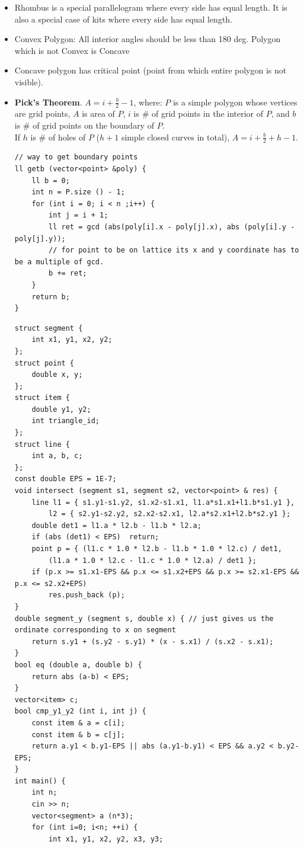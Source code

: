 \documentclass[8pt, a4paper, oneside, twocolumn]{extarticle}
\begin{document}
\begin{itemize}
    \item Rhombus is a special parallelogram where every side has equal length. It is also a special case of kits where every side has equal length.    
    \item Convex Polygon: All interior angles should be less than 180 deg. Polygon which is not Convex is Concave
    \item Concave polygon has critical point (point from which entire polygon is not visible).
    \item \textbf{Pick's Theorem}. $A=i+\frac{b}{2}-1$, where: $P$ is a simple polygon whose vertices are grid points, $A$ is area of $P$, $i$ is \# of grid points in the interior of $P$, and $b$ is \# of grid points on the boundary of $P$. \\
    If $h$ is \# of holes of $P$ ($h+1$ simple closed curves in total), $A=i+\frac{b}{2}+h-1$.
    \begin{verbatim}
// way to get boundary points
ll getb (vector<point> &poly) {
    ll b = 0;
    int n = P.size () - 1;
    for (int i = 0; i < n ;i++) {
        int j = i + 1; 
        ll ret = gcd (abs(poly[i].x - poly[j].x), abs (poly[i].y - poly[j].y));
        // for point to be on lattice its x and y coordinate has to be a multiple of gcd.
        b += ret;
    }
    return b;
}
    \end{verbatim}
    \begin{verbatim}
struct segment {
	int x1, y1, x2, y2;
};
struct point {
	double x, y;
};
struct item {
	double y1, y2;
	int triangle_id;
};
struct line {
	int a, b, c;
};
const double EPS = 1E-7;
void intersect (segment s1, segment s2, vector<point> & res) {
	line l1 = { s1.y1-s1.y2, s1.x2-s1.x1, l1.a*s1.x1+l1.b*s1.y1 },
		l2 = { s2.y1-s2.y2, s2.x2-s2.x1, l2.a*s2.x1+l2.b*s2.y1 };
	double det1 = l1.a * l2.b - l1.b * l2.a;
	if (abs (det1) < EPS)  return;
	point p = { (l1.c * 1.0 * l2.b - l1.b * 1.0 * l2.c) / det1,
		(l1.a * 1.0 * l2.c - l1.c * 1.0 * l2.a) / det1 };
	if (p.x >= s1.x1-EPS && p.x <= s1.x2+EPS && p.x >= s2.x1-EPS && p.x <= s2.x2+EPS)
		res.push_back (p);
}
double segment_y (segment s, double x) { // just gives us the ordinate corresponding to x on segment
	return s.y1 + (s.y2 - s.y1) * (x - s.x1) / (s.x2 - s.x1);
}
bool eq (double a, double b) {
	return abs (a-b) < EPS;
}
vector<item> c;
bool cmp_y1_y2 (int i, int j) {
	const item & a = c[i];
	const item & b = c[j];
	return a.y1 < b.y1-EPS || abs (a.y1-b.y1) < EPS && a.y2 < b.y2-EPS;
}
int main() {
	int n;
	cin >> n;
	vector<segment> a (n*3);
	for (int i=0; i<n; ++i) {
		int x1, y1, x2, y2, x3, y3;

\end{verbatim}
\end{itemize}
\end{document}
